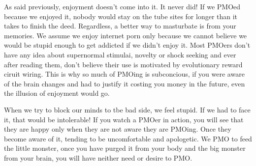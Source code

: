 \documentclass[easypeasy.tex]{subfiles}
\begin{document}
As said previously, enjoyment doesn't come into it. It never did! If we PMOed because we enjoyed it, nobody would stay on the tube sites for longer than it takes to finish the deed. Regardless, a better way to masturbate is from your memories. We assume we enjoy internet porn only because we cannot believe we would be stupid enough to get addicted if we didn't enjoy it. Most PMOers don't have any idea about supernormal stimulai, novelty or shock seeking and ever after reading them, don't believe their use is motivated by evolutionary reward ciruit wiring. This is why so much of PMOing is subconcious, if you were aware of the brain changes and had to justify it costing you money in the future, even the illusion of enjoyment would go.

When we try to block our minds to tbe bad side, we feel stupid. If we had to face it, that would be intolerable! If you watch a PMOer in action, you will see that they are happy only when they are not aware they are PMOing. Once they become aware of it, tending to be uncomfortable and apologetic. We PMO to feed the little monster, once you have purged it from your body and the big monster from your brain, you will have neither need or desire to PMO.
\end{document}
